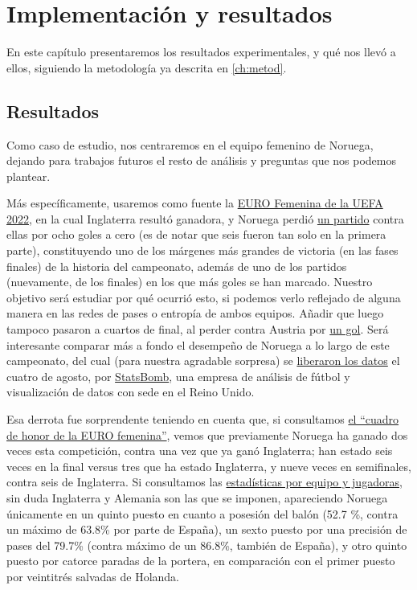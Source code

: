 \chapter{Implementación y resultados}
En este capítulo presentaremos los resultados experimentales, y qué nos llevó a ellos, siguiendo 
la metodología ya descrita en \ref{ch:metod}.

\section{Resultados}
Como caso de estudio, nos centraremos en el equipo femenino de Noruega, dejando para trabajos futuros el resto 
de análisis y preguntas que nos podemos plantear.

Más específicamente, usaremos como fuente la 
\href{https://es.uefa.com/womenseuro/news/0258-0e223de64a73-41a64bf308f9-1000--todos-los-resultados/?iv=true}{EURO 
Femenina de la UEFA 2022}, en la cual Inglaterra resultó ganadora, y Noruega perdió 
\href{https://es.uefa.com/womenseuro/match/2032209--england-vs-norway/}{un partido} contra ellas por ocho 
goles a cero (es de notar que seis fueron tan solo en la primera parte), constituyendo uno de los márgenes más 
grandes de victoria (en las fases finales) de la historia 
del campeonato, además de uno de los partidos (nuevamente, de los finales) en los que más goles se han marcado. 
Nuestro objetivo será estudiar por qué ocurrió esto, si podemos verlo reflejado de alguna manera 
en las redes de pases o entropía de ambos equipos. Añadir que luego tampoco pasaron a cuartos de final, al perder 
contra Austria por \href{https://es.uefa.com/womenseuro/match/2032211--austria-vs-norway/}{un gol}. Será interesante 
comparar más a fondo el desempeño de Noruega a lo largo de este campeonato, del cual (para nuestra agradable sorpresa) se 
\href{https://statsbomb.com/articles/soccer/statsbomb-release-free-360-data-womens-euro-2022-available-now/}{
liberaron los datos} el cuatro de agosto, por \href{https://statsbomb.com/}{StatsBomb}, una empresa de 
análisis de fútbol y visualización de datos con sede en el Reino Unido.

Esa derrota fue sorprendente teniendo en cuenta que, si consultamos 
\href{https://www.uefa.com/womenseuro/news/023d-0e16a7c86b1c-05ff0a6fb380-1000--uefa-women-s-euro-facts-and-figures-player-records-most-goals-b/}{
el ``cuadro de honor de la EURO femenina''}, vemos que previamente Noruega ha ganado dos veces esta 
competición, contra una vez que ya ganó Inglaterra; han estado seis veces en la final versus tres que ha 
estado Inglaterra, y nueve veces en semifinales, contra seis de Inglaterra. 
Si consultamos las \href{https://www.uefa.com/womenseuro/statistics/}{estadísticas por equipo y jugadoras}, sin 
duda Inglaterra y Alemania son las que se imponen, apareciendo Noruega únicamente en un quinto puesto en cuanto 
a posesión del balón (52.7 \%, contra un máximo de 63.8\% por parte de España), un sexto puesto por una 
precisión de pases del 79.7\% (contra máximo de un 86.8\%, también de España), y otro quinto puesto por catorce paradas 
de la portera, en comparación con el primer puesto por veintitrés salvadas de Holanda. 

